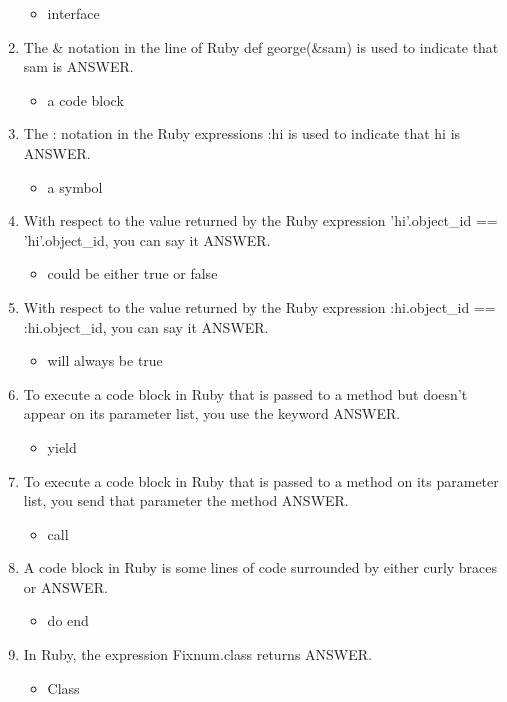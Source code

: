 \documentclass{exam}
\begin{document}
\begin{enumerate}
\begin{itemize}
\item interface
\end{itemize}
\item The \& notation in the line of Ruby def george(\&sam) is used to indicate that sam is ANSWER.
\begin{itemize}
\item a code block
\end{itemize}
\item The : notation in the Ruby expressions :hi is used to indicate that hi is ANSWER.
\begin{itemize}
\item a symbol
\end{itemize}
\item With respect to the value returned by the Ruby expression 'hi'.object\_id == 'hi'.object\_id, you can say it ANSWER.
\begin{itemize}
\item could be either true or false
\end{itemize}
\item With respect to the value returned by the Ruby expression :hi.object\_id == :hi.object\_id, you can say it ANSWER.
\begin{itemize}
\item will always be true
\end{itemize}
\item To execute a code block in Ruby that is passed to a method but doesn't appear on its parameter list, you use the keyword ANSWER.
\begin{itemize}
\item yield
\end{itemize}
\item To execute a code block in Ruby that is passed to a method on its parameter list, you send that parameter the method ANSWER.
\begin{itemize}
\item call
\end{itemize}
\item A code block in Ruby is some lines of code surrounded by either curly braces or ANSWER.
\begin{itemize}
\item do end
\end{itemize}
\item In Ruby, the expression Fixnum.class returns ANSWER.
\begin{itemize}
\item Class

\end{itemize}
\end{enumerate}
\end{document}
